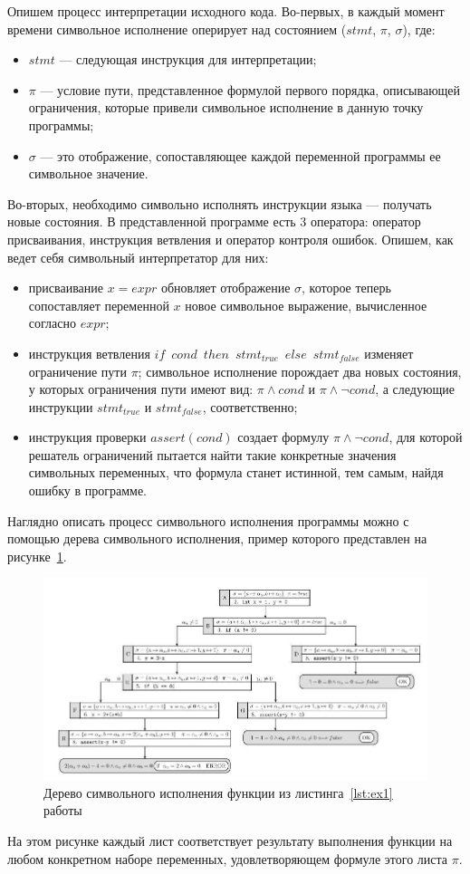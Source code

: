 Опишем процесс интерпретации исходного кода.
Во-первых, в каждый момент времени символьное исполнение оперирует над состоянием ($stmt$, $\pi$, $\sigma$), где:
\begin{itemize}
    \item $stmt$ --- следующая инструкция для интерпретации;
    \item $\pi$ --- условие пути, представленное формулой первого порядка, описывающей ограничения, которые привели символьное исполнение в данную точку программы;
    \item $\sigma$ --- это отображение, сопоставляющее каждой переменной программы ее символьное значение.
\end{itemize}
Во-вторых, необходимо символьно исполнять инструкции языка --- получать новые состояния. 
В представленной программе есть 3 оператора: оператор присваивания, инструкция ветвления и оператор контроля ошибок. 
Опишем, как ведет себя символьный интерпретатор для них:
\begin{itemize}
    \item присваивание $x = expr$ обновляет отображение $\sigma$, которое теперь сопоставляет переменной $x$ новое символьное выражение, вычисленное согласно $expr$;
    \item инструкция ветвления $if$~$cond$~$then$~$stmt_{true}$~$else$~$stmt_{false}$ изменяет ограничение пути $\pi$; символьное исполнение порождает два новых состояния, у которых ограничения пути имеют вид: $\pi \land cond$ и $\pi \land \neg cond$, а следующие инструкции $stmt_{true}$ и $stmt_{false}$, соответственно;
    \item инструкция проверки $assert(cond)$ создает формулу $\pi \land \neg cond$, для которой решатель ограничений пытается найти такие конкретные значения символьных переменных, что формула  станет истинной, тем самым, найдя ошибку в программе.
\end{itemize}

Наглядно описать процесс символьного исполнения программы можно с помощью дерева символьного исполнения, пример которого представлен на рисунке~\ref{exec-tree}.
\begin{figure}[H]
\centering
\includegraphics[scale=0.7,angle =270]{Batoev/images/sym_ex_tree.jpg}
\caption{Дерево символьного исполнения функции из листинга~\ref{lst:ex1} работы~\cite{baldoni2018survey}}
\label{exec-tree}
\end{figure}
На этом рисунке каждый лист соответствует результату выполнения функции на любом конкретном наборе переменных, удовлетворяющем формуле этого листа $\pi$.

